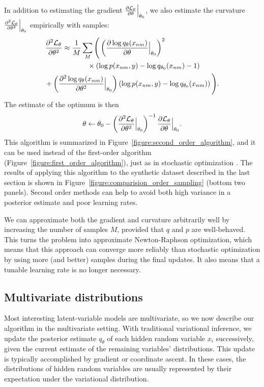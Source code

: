 In addition to estimating the gradient $\frac{\partial \mathcal{L}_\theta }{\partial \theta} \Bigr|_{\theta_0}$, we also estimate the curvature
$\frac{\partial^2 \mathcal{L}_\theta }{\partial {\theta}^2} \Bigr|_{\theta_0}$
empirically with samples:
\begin{align}
  \label{equation:empirical_second_order_estimates}
  \displaystyle \partll{\mathcal{L}_\theta }{\theta} & \approx
  \frac{1}{M} \sum_M \Bigg(
  \left( \partl{\log q_\theta(x_{nm})}{\theta} \Bigr|_{\theta_0} \right)^2 \\ \nonumber
  & \hspace{35pt} \times \left( \log p(x_{nm},  y) - \log q_{\theta_0}(x_{nm}) - 1 \right)  \\ \nonumber
 &   \hspace{-25pt} + \left( \partll{\log q_\theta(x_{nm})}{\theta} \Bigr|_{\theta_0} \right) \left( \log p(x_{nm},  y) - \log q_{\theta_0}(x_{nm}) \right) \Bigg). \nonumber
\end{align}
The estimate of the optimum is then
\begin{align}
  \displaystyle \theta \gets \theta_0 - \left( 
  \frac{\partial^2 \mathcal{L}_\theta }{\partial {\theta}^2} \Bigr|_{\theta_0}
  \right)^{-1}
  \frac{\partial \mathcal{L}_\theta }{\partial \theta} \Bigr|_{\theta_0}.
  \label{equation:second_order_updates}
\end{align}
This algorithm is summarized in
Figure~\ref{figure:second_order_algorithm}, and it can be used instead
of the first-order algorithm
(Figure~\ref{figure:first_order_algorithm}), just as in stochastic
optimization \cite{bottou:2004}.  The results of applying this
algorithm to the synthetic dataset described in the last section is
shown in Figure~\ref{figure:comparision_order_sampling} (bottom two
panels).  Second order methods can help to avoid both high variance in
a posterior estimate and poor learning rates.

We can approximate both the gradient and curvature arbitrarily well by
increasing the number of samples $M$, provided that $q$ and $p$ are
well-behaved.  This turns the problem into approximate Newton-Raphson
optimization, which means that this approach can converge more
reliably than stochastic optimization by using more (and better)
samples during the final updates.  It also means that a tunable
learning rate is no longer necessary.

\subsection{Multivariate distributions}
Most interesting latent-variable models are multivariate, so we now describe
our algorithm in the multivariate setting.  With traditional variational
inference, we update the posterior estimate $q_\theta$ of each hidden
random variable $x_i$ successively, given the current estimate of the
remaining variables' distributions.  This update is typically
accomplished by gradient or coordinate ascent.  In these cases, the
distributions of hidden random variables are usually represented by
their expectation under the variational distribution.

